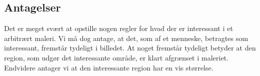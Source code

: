 {\subsection{Antagelser}
Det er meget svært at opstille nogen regler for hvad der er interessant i et
arbitrært maleri. Vi må dog antage, at det, som af et menneske, betragtes
som interessant, fremstår tydeligt i billedet. At noget fremstår
tydeligt betyder at den region, som udgør det interessante område, er
klart afgrænset i maleriet. Endvidere antager vi at den interessante
region har en vis størrelse.

}

